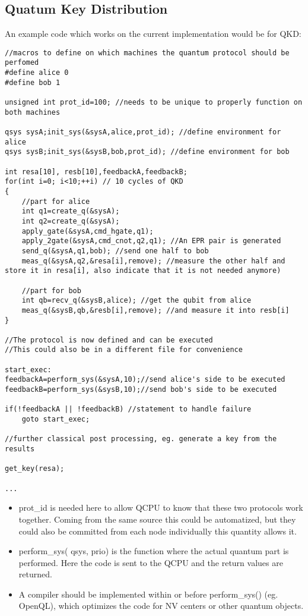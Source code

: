 \documentclass[]{article}
\begin{document}
\subsection{Quatum Key Distribution}
An example code which works on the current implementation would be for QKD:
\begin{lstlisting}[style=CStyle]
//macros to define on which machines the quantum protocol should be perfomed
#define alice 0
#define bob 1  

unsigned int prot_id=100; //needs to be unique to properly function on both machines

qsys sysA;init_sys(&sysA,alice,prot_id); //define environment for alice
qsys sysB;init_sys(&sysB,bob,prot_id); //define environment for bob

int resa[10], resb[10],feedbackA,feedbackB;
for(int i=0; i<10;++i) // 10 cycles of QKD
{
	//part for alice
	int q1=create_q(&sysA);
	int q2=create_q(&sysA);
	apply_gate(&sysA,cmd_hgate,q1);
	apply_2gate(&sysA,cmd_cnot,q2,q1); //An EPR pair is generated
	send_q(&sysA,q1,bob); //send one half to bob
	meas_q(&sysA,q2,&resa[i],remove); //measure the other half and store it in resa[i], also indicate that it is not needed anymore)
	
	//part for bob
	int qb=recv_q(&sysB,alice); //get the qubit from alice
	meas_q(&sysB,qb,&resb[i],remove); //and measure it into resb[i]
}

//The protocol is now defined and can be executed
//This could also be in a different file for convenience 

start_exec:
feedbackA=perform_sys(&sysA,10);//send alice's side to be executed
feedbackB=perform_sys(&sysB,10);//send bob's side to be executed

if(!feedbackA || !feedbackB) //statement to handle failure
	goto start_exec;

//further classical post processing, eg. generate a key from the results

get_key(resa);

...

\end{lstlisting}
\begin{itemize}
	\item prot\_id is needed here to allow QCPU to know that these two protocols work together. Coming from the same source this could be automatized, but they could also be committed from each node individually this quantity allows it.
	\item perform\_sys( qsys, prio) is the function where the actual quantum part is performed. Here the code is sent to the QCPU and the return values are returned.
	\item A compiler should be implemented within or before perform\_sys() (eg. OpenQL), which optimizes the code for NV centers or other quantum objects.
\end{itemize}
\end{document}
